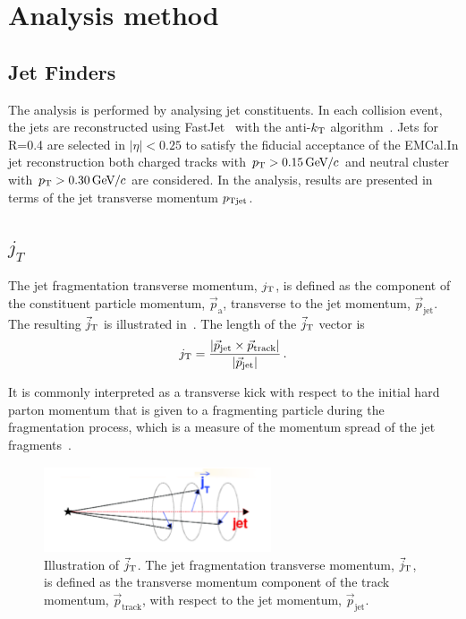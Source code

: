 \section{Analysis method}
\label{sec:methods}

\subsection{Jet Finders}


The analysis is performed by analysing jet constituents. In each collision event, the jets are reconstructed using FastJet~\cite{fastjet} with the anti-$k_{\rm T}$ algorithm~\cite{antikt}. Jets for R=0.4 are selected in $\left| \eta \right| < 0.25 $ to satisfy the fiducial acceptance of the EMCal.In jet reconstruction both charged tracks with $p_{\rm T}>0.15\,\mathrm{GeV}\kern-0.05em/\kern-0.02em c$ and neutral cluster with $p_{\rm T}>0.30\,\mathrm{GeV}\kern-0.05em/\kern-0.02em c$ are considered. In the analysis, results are presented in terms of the jet transverse momentum $p_{\rm Tjet}$.

\subsection{$j_T$ }


The jet fragmentation transverse momentum, $j_{\rm T}$, is defined as the component of the constituent particle momentum, $\vec{p}_{\mathrm{a}}$, transverse to the jet momentum, $\vec{p}_{\mathrm{jet}}$. The resulting $\vec{j}_{\rm T}$ is illustrated in~. The length of the $\vec{j}_{\rm T}$ vector is
  \begin{equation}
    j_{\rm T} = \frac{|\vec{p}_{\mathrm{jet}} \times \vec{p}_{\mathrm{track}}|}{|\vec{p}_{\mathrm{jet}}|} \,.
  \label{eq:jtdefinition}
  \end{equation}

It is commonly interpreted as a transverse kick with respect to the initial hard parton momentum that is given to a fragmenting particle during the fragmentation process, which is a measure of the momentum spread of the jet fragments~\cite{}. 

   \begin{figure}
    \begin{center}
      \includegraphics[width = 0.60\textwidth]{figures/jt_def}
    \end{center}
    \caption{Illustration of $\vec{j}_{\rm T}$. The jet fragmentation transverse momentum, $\vec{j}_{\rm T}$, is defined as the transverse momentum component of the track momentum, $\vec{p}_{\mathrm{track}}$, with respect to the jet momentum, $\vec{p}_{\mathrm{jet}}$.}
    \label{fig:jtdefinition}
  \end{figure}

